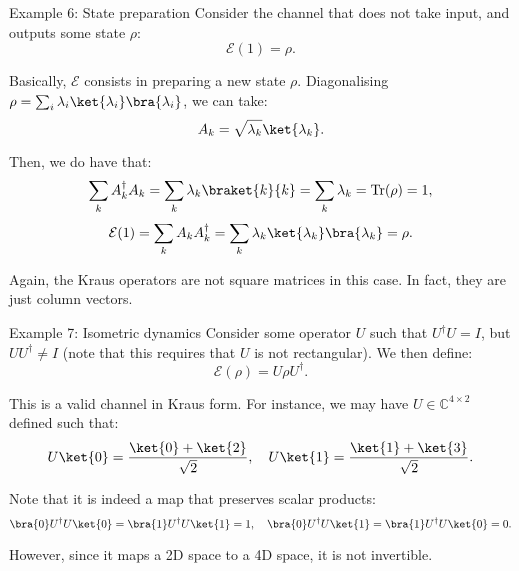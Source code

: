 \documentclass[a4paper]{article}
\begin{document}
\begin{parag}{Example 6: State preparation}
    Consider the channel that does not take input, and outputs some state $\rho$: 
    \[\mathcal{E}\left(1\right) = \rho.\]

    Basically, $\mathcal{E}$ consists in preparing a new state $\rho$. Diagonalising $\rho = \sum_{i} \lambda_i \ket{\lambda_i}\bra{\lambda_i}$, we can take: 
    \[A_k = \sqrt{\lambda_k} \ket{\lambda_k}.\]
    
    Then, we do have that: 
    \[\sum_{k} A_k^{\dagger} A_k = \sum_{k} \lambda_k \braket{k}{k} = \sum_{k} \lambda_k = \Tr\left(\rho\right) = 1,\]
    \[\mathcal{E}\left(1\right) = \sum_{k} A_k A_k^{\dagger} = \sum_k \lambda_k \ket{\lambda_k}\bra{\lambda_k} = \rho.\]

    Again, the Kraus operators are not square matrices in this case. In fact, they are just column vectors.
\end{parag}

\begin{parag}{Example 7: Isometric dynamics}
    Consider some operator $U$ such that $U^{\dagger} U = I$, but $U U^{\dagger} \neq I$ (note that this requires that $U$ is not rectangular). We then define: 
    \[\mathcal{E}\left(\rho\right) = U \rho U^{\dagger}.\]

    This is a valid channel in Kraus form. For instance, we may have $U \in \mathbb{C}^{4 \times 2}$ defined such that: 
    \[U \ket{0} = \frac{\ket{0} + \ket{2}}{\sqrt{2}}, \mathspace U \ket{1} = \frac{\ket{1} + \ket{3}}{\sqrt{2}}.\]

    Note that it is indeed a map that preserves scalar products:
    \[\bra{0} U^{\dagger} U \ket{0} = \bra{1} U^{\dagger} U \ket{1} = 1, \mathspace \bra{0} U^{\dagger} U \ket{1} = \bra{1} U^{\dagger} U \ket{0} = 0.\]

    However, since it maps a 2D space to a 4D space, it is not invertible.
\end{parag}
\end{document}
